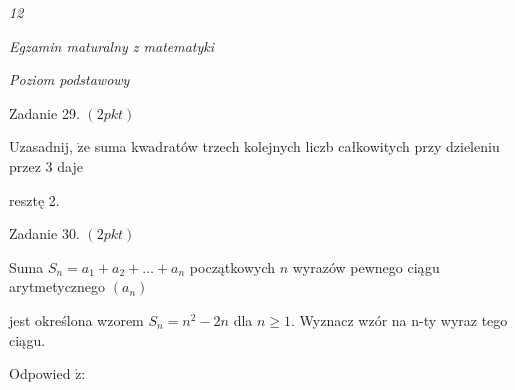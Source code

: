 \documentclass[a4paper,12pt]{article}
\begin{document}
{\it 12}

{\it Egzamin maturalny z matematyki}

{\it Poziom podstawowy}

Zadanie 29. $(2pkt)$

Uzasadnij, $\dot{\mathrm{z}}\mathrm{e}$ suma kwadratów trzech kolejnych liczb całkowitych przy dzieleniu przez 3 daje

resztę 2.

Zadanie 30. $(2pkt)$

Suma $S_{n}=a_{1}+a_{2}+\ldots+a_{n}$ początkowych $n$ wyrazów pewnego ciągu arytmetycznego $(a_{n})$

jest określona wzorem $S_{n}=n^{2}-2n$ dla $n\geq 1$. Wyznacz wzór na n-ty wyraz tego ciągu.

Odpowied $\acute{\mathrm{z}}$:
\end{document}
